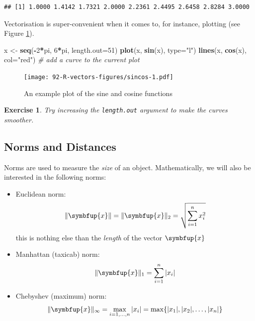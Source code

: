 \documentclass[10pt,b5paper,krantz1]{krantz}
\newenvironment{Shaded}{\begin{snugshade}}{\end{snugshade}}
\newcommand{\CommentTok}[1]{\textcolor[rgb]{0.37,0.37,0.37}{\textit{#1}}}
\newcommand{\DataTypeTok}[1]{\textcolor[rgb]{0.27,0.27,0.27}{#1}}
\newcommand{\DecValTok}[1]{\textcolor[rgb]{0.06,0.06,0.06}{#1}}
\newcommand{\KeywordTok}[1]{\textcolor[rgb]{0.27,0.27,0.27}{\textbf{#1}}}
\newcommand{\NormalTok}[1]{#1}
\newcommand{\OperatorTok}[1]{\textcolor[rgb]{0.43,0.43,0.43}{\textbf{#1}}}
\newcommand{\StringTok}[1]{\textcolor[rgb]{0.5,0.5,0.5}{#1}}
\providecommand{\tightlist}{%
  \setlength{\itemsep}{0pt}\setlength{\parskip}{0pt}}
\newtheorem{exercise}{Exercise}[chapter]
\renewcommand{\boldsymbol}[1]{\symbfup{#1}}
\begin{document}
\begin{verbatim}
## [1] 1.0000 1.4142 1.7321 2.0000 2.2361 2.4495 2.6458 2.8284 3.0000
\end{verbatim}

Vectorisation is super-convenient when it comes to, for instance,
plotting (see Figure \ref{fig:sincos}).

\begin{Shaded}
\begin{Highlighting}[]
\NormalTok{x <-}\StringTok{ }\KeywordTok{seq}\NormalTok{(}\OperatorTok{-}\DecValTok{2}\OperatorTok{*}\NormalTok{pi, }\DecValTok{6}\OperatorTok{*}\NormalTok{pi, }\DataTypeTok{length.out=}\DecValTok{51}\NormalTok{)}
\KeywordTok{plot}\NormalTok{(x, }\KeywordTok{sin}\NormalTok{(x), }\DataTypeTok{type=}\StringTok{"l"}\NormalTok{)}
\KeywordTok{lines}\NormalTok{(x, }\KeywordTok{cos}\NormalTok{(x), }\DataTypeTok{col=}\StringTok{"red"}\NormalTok{) }\CommentTok{# add a curve to the current plot}
\end{Highlighting}
\end{Shaded}

\begin{figure}
\hypertarget{fig:sincos}{%
\centering
\texttt{[image: 92-R-vectors-figures/sincos-1.pdf]}
\caption{An example plot of the sine and cosine functions}\label{fig:sincos}
}
\end{figure}

\begin{exercise}

Try increasing the \texttt{length.out} argument to make the curves smoother.

\end{exercise}

\hypertarget{norms-and-distances}{%
\subsection{Norms and Distances}\label{norms-and-distances}}

Norms are used to measure the \emph{size} of an object.
Mathematically, we will also be interested in the following norms:

\begin{itemize}
\tightlist
\item
  Euclidean norm:
  \[
  \|\boldsymbol{x}\| = \|\boldsymbol{x}\|_2 = \sqrt{ \sum_{i=1}^n x_i^2 }
  \]
  this is nothing else than the \emph{length} of the vector \(\boldsymbol{x}\)
\item
  Manhattan (taxicab) norm:
  \[
  \|\boldsymbol{x}\|_1 = \sum_{i=1}^n |x_i|
  \]
\item
  Chebyshev (maximum) norm:
  \[
  \|\boldsymbol{x}\|_\infty = \max_{i=1,\dots,n} |x_i|
  = \max\{ |x_1|, |x_2|, \dots, |x_n| \}
  \]
\end{itemize}
\end{document}
